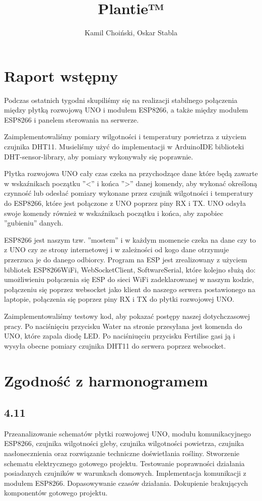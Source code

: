 \documentclass{article}
\begin{document}
\title{Plantie™}
\author{Kamil Choiński, Oskar Stabla}
\maketitle

\section{Raport wstępny}
Podczas ostatnich tygodni skupiliśmy się na realizacji stabilnego połączenia między płytką rozwojową UNO i modułem ESP8266, a także między modułem ESP8266 i panelem sterowania na serwerze.

Zaimplementowaliśmy pomiary wilgotności i temperatury powietrza z użyciem czujnika DHT11. Musieliśmy użyć do implementacji w ArduinoIDE biblioteki DHT-sensor-library, aby pomiary wykonywały się poprawnie.

Płytka rozwojowa UNO cały czas czeka na przychodzące dane które będą zawarte w wskaźnikach początku ''<'' i końca ''>'' danej komendy, aby wykonać określoną czynność lub odesłać pomiary wykonane przez czujnik wilgotności i temperatury do ESP8266, które jest połączone z UNO poprzez piny RX i TX. UNO odsyła swoje komendy również w wskaźnikach początku i końca, aby zapobiec ''gubieniu'' danych.

ESP8266 jest naszym tzw. ''mostem'' i w każdym momencie czeka na dane czy to z UNO czy ze strony internetowej i w zależności od kogo dane otrzymuje przerzuca je do danego odbiorcy.
Program na ESP jest zrealizowany z użyciem bibliotek ESP8266WiFi, WebSocketClient, SoftwareSerial, które kolejno służą do: umożliwieniu połączenia się ESP do sieci WiFi zadeklarowanej w naszym kodzie, połączeniu się poprzez websocket jako klient do naszego serwera postawionego na laptopie, połączenia się poprzez piny RX i TX do płytki rozwojowej UNO.

Zaimplementowaliśmy testowy kod, aby pokazać postępy naszej dotychczasowej pracy. Po naciśnięciu przycisku Water na stronie przesyłana jest komenda do UNO, które zapala diodę LED. Po naciśniuęciu przycisku Fertilise gasi ją i wysyła obecne pomiary czujnika DHT11 do serwera poprzez websocket.



\section{Zgodność z harmonogramem}
\subsection{4.11}
Przeanalizowanie schematów płytki rozwojowej UNO, modułu komunikacyjnego ESP8266, czujnika wilgotności gleby, czujnika wilgotności powietrza, czujnika nasłonecznienia oraz rozwiązanie techniczne doświetlania rośliny. Stworzenie schematu elektrycznego gotowego projektu. Testowanie poprawności działania posiadanych czujników w warunkach domowych. Implementacja komunikacji z modułem ESP8266. Dopasowywanie czasów działania. 
Dokupienie brakujących komponentów gotowego projektu. 
\end{document}
